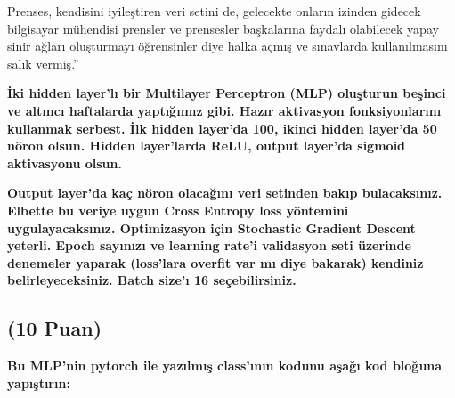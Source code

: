\documentclass[11pt]{article}
\begin{document}
Prenses, kendisini iyileştiren veri setini de, gelecekte onların izinden gidecek bilgisayar mühendisi prensler ve prensesler başkalarına faydalı olabilecek yapay sinir ağları oluşturmayı öğrensinler diye halka açmış ve sınavlarda kullanılmasını salık vermiş.''

\textbf{İki hidden layer'lı bir Multilayer Perceptron (MLP) oluşturun beşinci ve altıncı haftalarda yaptığımız gibi. Hazır aktivasyon fonksiyonlarını kullanmak serbest. İlk hidden layer'da 100, ikinci hidden layer'da 50 nöron olsun. Hidden layer'larda ReLU, output layer'da sigmoid aktivasyonu olsun.}

\textbf{Output layer'da kaç nöron olacağını veri setinden bakıp bulacaksınız. Elbette bu veriye uygun Cross Entropy loss yöntemini uygulayacaksınız. Optimizasyon için Stochastic Gradient Descent yeterli. Epoch sayınızı ve learning rate'i validasyon seti üzerinde denemeler yaparak (loss'lara overfit var mı diye bakarak) kendiniz belirleyeceksiniz. Batch size'ı 16 seçebilirsiniz.}

\subsection{(10 Puan)} \textbf{Bu MLP'nin pytorch ile yazılmış class'ının kodunu aşağı kod bloğuna yapıştırın:}
\end{document}
